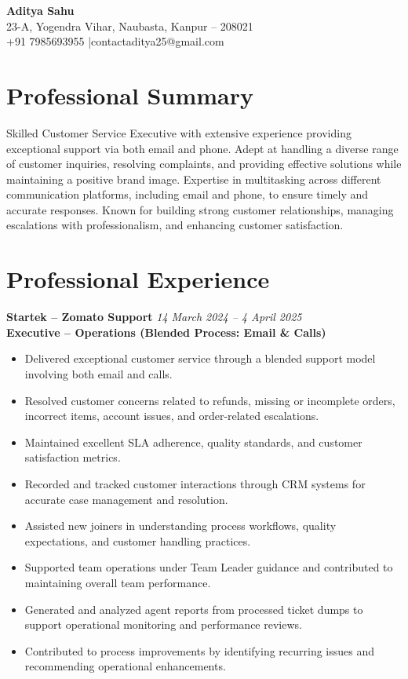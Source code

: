 \documentclass[11pt,a4paper]{article}
\begin{document}
\begin{center}
{\LARGE \textbf{Aditya Sahu}}\\[4pt]
23-A, Yogendra Vihar, Naubasta, Kanpur – 208021 \\
+91 7985693955 \quad|\quad contactaditya25@gmail.com
\end{center}

\section*{Professional Summary}
Skilled Customer Service Executive with extensive experience providing exceptional support via both email and phone. Adept at handling a diverse range of customer inquiries, resolving complaints, and providing effective solutions while maintaining a positive brand image. Expertise in multitasking across different communication platforms, including email and phone, to ensure timely and accurate responses. Known for building strong customer relationships, managing escalations with professionalism, and enhancing customer satisfaction.

\section*{Professional Experience}

\textbf{Startek – Zomato Support} \hfill \textit{14 March 2024 -- 4 April 2025}\\
\textbf{Executive – Operations (Blended Process: Email \& Calls)}
\begin{itemize}[leftmargin=*]
\item Delivered exceptional customer service through a blended support model involving both email and calls.
\item Resolved customer concerns related to refunds, missing or incomplete orders, incorrect items, account issues, and order-related escalations.
\item Maintained excellent SLA adherence, quality standards, and customer satisfaction metrics.
\item Recorded and tracked customer interactions through CRM systems for accurate case management and resolution.
\item Assisted new joiners in understanding process workflows, quality expectations, and customer handling practices.
\item Supported team operations under Team Leader guidance and contributed to maintaining overall team performance.
\item Generated and analyzed agent reports from processed ticket dumps to support operational monitoring and performance reviews.
\item Contributed to process improvements by identifying recurring issues and recommending operational enhancements.
\end{itemize}
\end{document}

